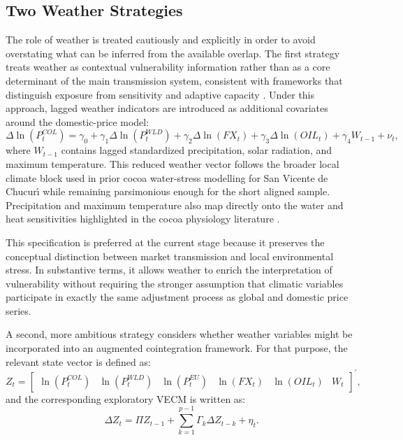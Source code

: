 \documentclass[11pt]{article}
\begin{document}
\subsection{Two Weather Strategies}

The role of weather is treated cautiously and explicitly in order to avoid overstating what can be inferred from the available overlap. The first strategy treats weather as contextual vulnerability information rather than as a core determinant of the main transmission system, consistent with frameworks that distinguish exposure from sensitivity and adaptive capacity \citep{Turner2003,Adger2006}. Under this approach, lagged weather indicators are introduced as additional covariates around the domestic-price model:
\begin{equation}
\Delta \ln(P^{COL}_{t}) = \gamma_0 + \gamma_1 \Delta \ln(P^{WLD}_{t}) + \gamma_2 \Delta \ln(FX_t) + \gamma_3 \Delta \ln(OIL_t) + \gamma_4 W_{t-1} + \nu_t,
\label{eq:weather_context}
\end{equation}
where $W_{t-1}$ contains lagged standardized precipitation, solar radiation, and maximum temperature. This reduced weather vector follows the broader local climate block used in prior cocoa water-stress modelling for San Vicente de Chucur\'{\i} \citep{talero_sarmiento_etal_2025} while remaining parsimonious enough for the short aligned sample. Precipitation and maximum temperature also map directly onto the water and heat sensitivities highlighted in the cocoa physiology literature \citep{Lahive2019}. %

This specification is preferred at the current stage because it preserves the conceptual distinction between market transmission and local environmental stress. In substantive terms, it allows weather to enrich the interpretation of vulnerability without requiring the stronger assumption that climatic variables participate in exactly the same adjustment process as global and domestic price series.

A second, more ambitious strategy considers whether weather variables might be incorporated into an augmented cointegration framework. For that purpose, the relevant state vector is defined as:
\begin{equation}
Z_t =
\begin{bmatrix}
\ln(P^{COL}_{t}) &
\ln(P^{WLD}_{t}) &
\ln(P^{EU}_{t}) &
\ln(FX_t) &
\ln(OIL_t) &
W_t
\end{bmatrix}^{\prime},
\label{eq:augmented_state}
\end{equation}
and the corresponding exploratory VECM is written as:
\begin{equation}
\Delta Z_t = \Pi Z_{t-1} + \sum_{k=1}^{p-1} \Gamma_k \Delta Z_{t-k} + \eta_t.
\label{eq:vecm}
\end{equation}
\end{document}
